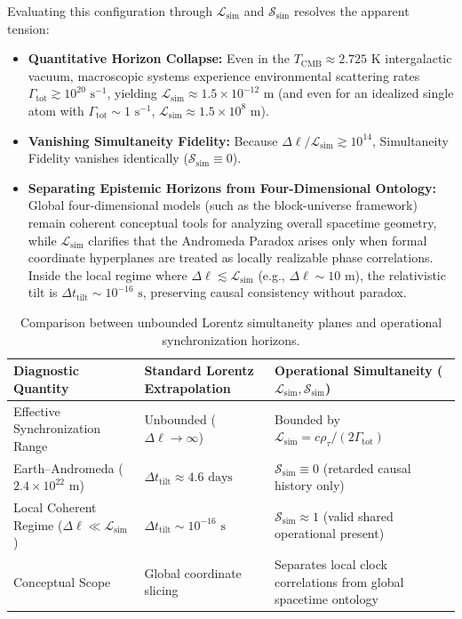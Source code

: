 \documentclass[11pt,a4paper]{article}
\begin{document}
Evaluating this configuration through $\mathcal{L}_{\mathrm{sim}}$ and $\mathcal{S}_{\mathrm{sim}}$ resolves the apparent tension:
\begin{itemize}
    \item \textbf{Quantitative Horizon Collapse:} Even in the $T_{\mathrm{CMB}} \approx 2.725\text{ K}$ intergalactic vacuum, macroscopic systems experience environmental scattering rates $\Gamma_{\mathrm{tot}} \gtrsim 10^{20}\text{ s}^{-1}$, yielding $\mathcal{L}_{\mathrm{sim}} \approx 1.5 \times 10^{-12}\text{ m}$ (and even for an idealized single atom with $\Gamma_{\mathrm{tot}} \sim 1\text{ s}^{-1}$, $\mathcal{L}_{\mathrm{sim}} \approx 1.5 \times 10^8\text{ m}$).
    \item \textbf{Vanishing Simultaneity Fidelity:} Because $\Delta \ell / \mathcal{L}_{\mathrm{sim}} \gtrsim 10^{14}$, Simultaneity Fidelity vanishes identically ($\mathcal{S}_{\mathrm{sim}} \equiv 0$).
    \item \textbf{Separating Epistemic Horizons from Four-Dimensional Ontology:} Global four-dimensional models (such as the block-universe framework) remain coherent conceptual tools for analyzing overall spacetime geometry, while $\mathcal{L}_{\mathrm{sim}}$ clarifies that the Andromeda Paradox arises only when formal coordinate hyperplanes are treated as locally realizable phase correlations. Inside the local regime where $\Delta \ell \lesssim \mathcal{L}_{\mathrm{sim}}$ (e.g., $\Delta \ell \sim 10\text{ m}$), the relativistic tilt is $\Delta t_{\mathrm{tilt}} \sim 10^{-16}\text{ s}$, preserving causal consistency without paradox.
\end{itemize}

\begin{table}[h!]
\centering
\small
\begin{tabular}{p{3.8cm} p{4.6cm} p{5.4cm}}
\toprule
\textbf{Diagnostic Quantity} & \textbf{Standard Lorentz Extrapolation} & \textbf{Operational Simultaneity ($\mathcal{L}_{\mathrm{sim}}, \mathcal{S}_{\mathrm{sim}}$)} \\
\midrule
Effective Synchronization Range & Unbounded ($\Delta \ell \to \infty$) & Bounded by $\mathcal{L}_{\mathrm{sim}} = c\rho_\tau / (2\Gamma_{\mathrm{tot}})$ \\
Earth--Andromeda ($2.4 \times 10^{22}\text{ m}$) & $\Delta t_{\mathrm{tilt}} \approx 4.6\text{ days}$ & $\mathcal{S}_{\mathrm{sim}} \equiv 0$ (retarded causal history only) \\
Local Coherent Regime ($\Delta \ell \ll \mathcal{L}_{\mathrm{sim}}$) & $\Delta t_{\mathrm{tilt}} \sim 10^{-16}\text{ s}$ & $\mathcal{S}_{\mathrm{sim}} \approx 1$ (valid shared operational present) \\
Conceptual Scope & Global coordinate slicing & Separates local clock correlations from global spacetime ontology \\
\bottomrule
\end{tabular}
\caption{Comparison between unbounded Lorentz simultaneity planes and operational synchronization horizons.}
\end{table}
\end{document}
